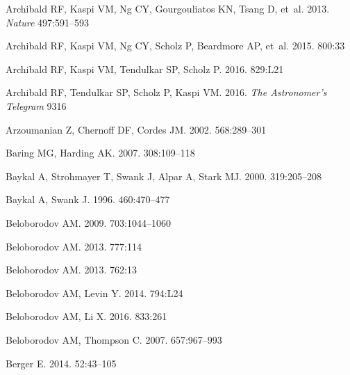 \documentclass[letterpaper]{ar-1col}
\begin{document}
\begin{thebibliography}{}
{Archibald} RF, {Kaspi} VM, {Ng} CY, {Gourgouliatos} KN, {Tsang} D, et~al.
  2013.
\textit{Nature} 497:591--593

{Archibald} RF, {Kaspi} VM, {Ng} CY, {Scholz} P, {Beardmore} AP, et~al.
  2015{}.
\textit{\apj} 800:33

{Archibald} RF, {Kaspi} VM, {Tendulkar} SP, {Scholz} P. 2016{}.
\textit{\apjl} 829:L21

{Archibald} RF, {Tendulkar} SP, {Scholz} P, {Kaspi} VM. 2016{}.
\textit{The Astronomer's Telegram} 9316

Arzoumanian Z, Chernoff DF, Cordes JM. 2002.
\textit{\apj} 568:289--301

{Baring} MG, {Harding} AK. 2007.
\textit{\apss} 308:109--118

Baykal A, Strohmayer T, Swank J, Alpar A, Stark MJ. 2000.
\textit{\mnras} 319:205--208

Baykal A, Swank J. 1996.
\textit{\apj} 460:470--477

{Beloborodov} AM. 2009.
\textit{\apj} 703:1044--1060

{Beloborodov} AM. 2013{}.
\textit{\apj} 777:114

{Beloborodov} AM. 2013{}.
\textit{\apj} 762:13

{Beloborodov} AM, {Levin} Y. 2014.
\textit{\apjl} 794:L24

{Beloborodov} AM, {Li} X. 2016.
\textit{\apj} 833:261

{Beloborodov} AM, {Thompson} C. 2007.
\textit{\apj} 657:967--993

{Berger} E. 2014.
\textit{\araa} 52:43--105


\end{thebibliography}
\end{document}
